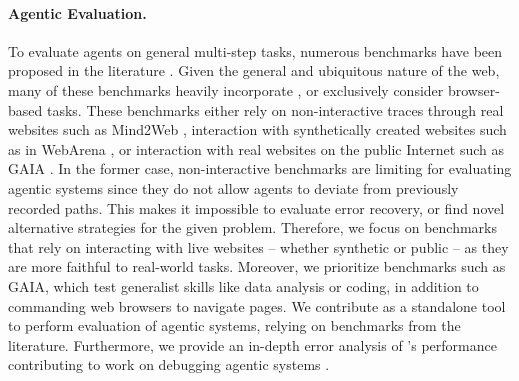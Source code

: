 \paragraph{Agentic Evaluation.} To evaluate agents on general multi-step tasks, numerous benchmarks have been proposed in the literature \cite{mialon-arxiv2023,zhou2024webarenarealisticwebenvironment,xie2024osworldbenchmarkingmultimodalagents,liu2024visualwebbenchfarmultimodalllms,yoran2024assistantbenchwebagentssolve,yao2023webshopscalablerealworldweb,shi2017world,deng2023mind2webgeneralistagentweb,pan2024webcanvasbenchmarkingwebagents,li2024websuite}. Given the general and ubiquitous nature of the web, many of these benchmarks heavily incorporate \cite{mialon2023gaiabenchmarkgeneralai, yoran2024assistantbenchwebagentssolve}, or exclusively consider \cite{zhou2024webarenarealisticwebenvironment, deng2023mind2webgeneralistagentweb} browser-based tasks. These benchmarks either rely on non-interactive traces through real websites such as Mind2Web \cite{deng2023mind2webgeneralistagentweb}, interaction with synthetically created websites such as in WebArena \cite{zhou2024webarenarealisticwebenvironment}, or interaction with real websites on the public Internet such as GAIA \cite{mialon2023gaiabenchmarkgeneralai}. In the former case, non-interactive benchmarks are  limiting for evaluating agentic systems since they do not allow agents to deviate from previously recorded paths. This makes it impossible to evaluate error recovery, or find novel alternative strategies for the given problem.
Therefore, we focus on benchmarks that rely on interacting with live websites -- whether synthetic or public -- as they are more faithful to real-world tasks. Moreover, we prioritize benchmarks such as GAIA, which test generalist skills like data analysis or coding, in addition to commanding web browsers to navigate pages. We contribute \agbench{} as a standalone tool to perform evaluation of agentic systems, relying on benchmarks from the literature. Furthermore, we provide an in-depth error analysis of \team's performance contributing to work on debugging agentic systems \cite{li2024websuite}.

